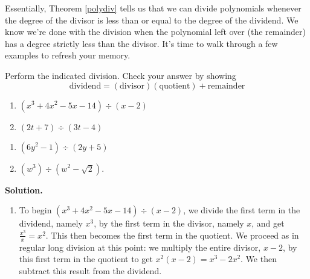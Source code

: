 \documentclass{ximera}
\begin{document}
\medskip

Essentially, Theorem \ref{polydiv} tells us that we can divide polynomials whenever the degree of the divisor is less than or equal to the degree of the dividend.  We know we're done with the division when the polynomial left over (the remainder) has a degree strictly less than the divisor.  It's time to walk through a few examples to refresh your memory.

\begin{ex}\label{polynomiallongdivex}  Perform the indicated division.  Check your answer by showing \[\text{dividend} = (\text{divisor})( \text{quotient}) + \text{remainder}\]

\begin{multicols}{2}

\begin{enumerate}

\item  $\left(x^3 + 4x^2 - 5x - 14\right) \div (x-2)$

\item  $\left(2t +  7\right) \div \left(3t - 4\right)$

\setcounter{HW}{\value{enumi}}

\end{enumerate}

\end{multicols}

\begin{multicols}{2}

\begin{enumerate}

\setcounter{enumi}{\value{HW}}



\item  $\left(6y^2 - 1 \right) \div \left(2y + 5\right)$

\item  $\left(w^3 \right) \div \left(w^2 - \sqrt{2}\right)$.

\setcounter{HW}{\value{enumi}}

\end{enumerate}

\end{multicols}


{\bf Solution.}

\begin{enumerate}

\item  To begin $\left(x^3 + 4x^2 - 5x - 14\right) \div (x-2)$, we divide the first term in the dividend, namely $x^3$, by the first term in the divisor, namely $x$, and get $\frac{x^3}{x} = x^2$. This then becomes the first term in the quotient.  We proceed as in regular long division at this point: we multiply the entire divisor, $x-2$, by this first term in the quotient to get $x^{2}(x - 2) = x^3 - 2x^2$.  We then subtract this result from the dividend.\setlength\arraycolsep{0.1pt}\setlength\extrarowheight{2pt}\[ \begin{array}{cccccccccc}


\end{array}\]
\end{enumerate}
\end{ex}
\end{document}
